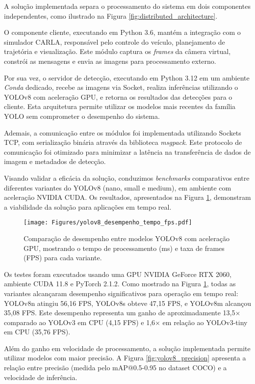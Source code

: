 A solução implementada separa o processamento do sistema em dois componentes independentes, como ilustrado na Figura \ref{fig:distributed_architecture}.


O componente cliente, executando em Python 3.6, mantém a integração com o simulador CARLA, responsável pelo controle do veículo, planejamento de trajetória e visualização. Este módulo captura os \textit{frames} da câmera virtual, constrói as mensagens e envia as imagens para processamento externo.

Por sua vez, o servidor de detecção, executando em Python 3.12 em um ambiente \textit{Conda} dedicado, recebe as imagens via Socket, realiza inferências utilizando o YOLOv8 com aceleração GPU, e retorna os resultados das detecções para o cliente. Esta arquitetura permite utilizar os modelos mais recentes da família YOLO sem comprometer o desempenho do sistema.

Ademais, a comunicação entre os módulos foi implementada utilizando Sockets TCP, com serialização binária através da biblioteca \textit{msgpack}. Este protocolo de comunicação foi otimizado para minimizar a latência na transferência de dados de imagem e metadados de detecção. 

Visando validar a eficácia da solução, conduzimos \textit{benchmarks} comparativos entre diferentes variantes do YOLOv8 (nano, small e medium), em ambiente com aceleração NVIDIA CUDA. Os resultados, apresentados na Figura \ref{fig:yolov8_performance}, demonstram a viabilidade da solução para aplicações em tempo real.

\begin{figure}[H]
\centering
\texttt{[image: Figures/yolov8\_desempenho\_tempo\_fps.pdf]}
\caption{Comparação de desempenho entre modelos YOLOv8 com aceleração GPU, mostrando o tempo de processamento (ms) e taxa de frames (FPS) para cada variante.}
\label{fig:yolov8_performance}
\end{figure}

Os testes foram executados usando uma GPU NVIDIA GeForce RTX 2060, ambiente CUDA 11.8 e PyTorch 2.1.2. Como mostrado na Figura \ref{fig:yolov8_performance}, todas as variantes alcançaram desempenho significativos para operação em tempo real: YOLOv8n atingiu 56,16 FPS, YOLOv8s obteve 47,15 FPS, e YOLOv8m alcançou 35,08 FPS. Este desempenho representa um ganho de aproximadamente 13,5$\times$ comparado ao YOLOv3 em CPU (4,15 FPS) e 1,6$\times$ em relação ao YOLOv3-tiny em CPU (35,76 FPS).

Além do ganho em velocidade de processamento, a solução implementada permite utilizar modelos com maior precisão. A Figura \ref{fig:yolov8_precision} apresenta a relação entre precisão (medida pelo mAP@0.5-0.95 no dataset COCO) e a velocidade de inferência.

